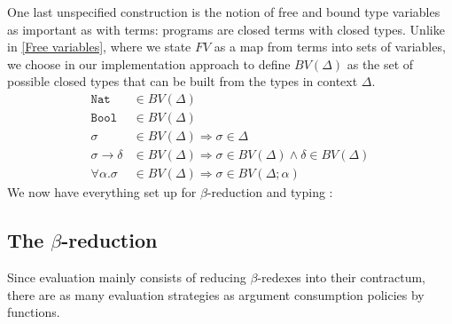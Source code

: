 \documentclass{article}
\begin{document}
     One last unspecified construction is the notion of free and bound type variables as important as with terms: programs are closed terms with closed types. Unlike in \ref{Free variables}, where we state $FV$ as a map from terms into sets of variables, we choose in our implementation approach to define $BV(\Delta)$ as the set of possible closed types that can be built from the types in context $\Delta$.
     \label{BV}\begin{align*}
        \texttt{Nat} &\in BV(\Delta)\\
        \texttt{Bool} &\in BV(\Delta)\\
        \sigma &\in BV(\Delta) \Rightarrow \sigma\in \Delta\\
        \sigma \rightarrow \delta &\in BV(\Delta) \Rightarrow \sigma \in BV(\Delta) \wedge \delta \in BV(\Delta)\\
        \forall \alpha.\sigma &\in BV(\Delta) \Rightarrow \sigma \in BV(\Delta;\alpha)
    \end{align*}
    We now have everything set up for $\beta$-reduction and typing :
    
    \subsection{The $\beta$-reduction}
    Since evaluation mainly consists of reducing $\beta$-redexes into their contractum, there are as many evaluation strategies as argument consumption policies by functions.
\end{document}
